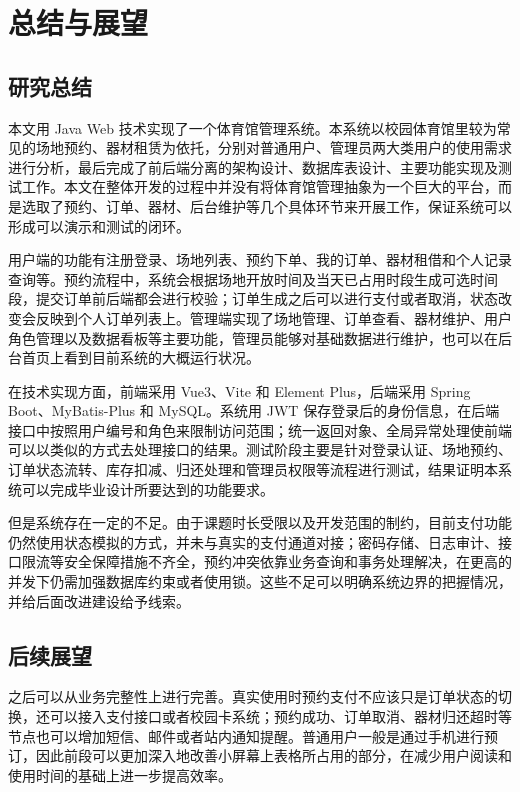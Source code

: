 
\chapter{总结与展望}

\section{研究总结}

本文用 Java Web 技术实现了一个体育馆管理系统。本系统以校园体育馆里较为常见的场地预约、器材租赁为依托，分别对普通用户、管理员两大类用户的使用需求进行分析，最后完成了前后端分离的架构设计、数据库表设计、主要功能实现及测试工作。本文在整体开发的过程中并没有将体育馆管理抽象为一个巨大的平台，而是选取了预约、订单、器材、后台维护等几个具体环节来开展工作，保证系统可以形成可以演示和测试的闭环。

用户端的功能有注册登录、场地列表、预约下单、我的订单、器材租借和个人记录查询等。预约流程中，系统会根据场地开放时间及当天已占用时段生成可选时间段，提交订单前后端都会进行校验；订单生成之后可以进行支付或者取消，状态改变会反映到个人订单列表上。管理端实现了场地管理、订单查看、器材维护、用户角色管理以及数据看板等主要功能，管理员能够对基础数据进行维护，也可以在后台首页上看到目前系统的大概运行状况。

在技术实现方面，前端采用 Vue3、Vite 和 Element Plus，后端采用 Spring Boot、MyBatis-Plus 和 MySQL。系统用 JWT 保存登录后的身份信息，在后端接口中按照用户编号和角色来限制访问范围；统一返回对象、全局异常处理使前端可以以类似的方式去处理接口的结果。测试阶段主要是针对登录认证、场地预约、订单状态流转、库存扣减、归还处理和管理员权限等流程进行测试，结果证明本系统可以完成毕业设计所要达到的功能要求。

但是系统存在一定的不足。由于课题时长受限以及开发范围的制约，目前支付功能仍然使用状态模拟的方式，并未与真实的支付通道对接；密码存储、日志审计、接口限流等安全保障措施不齐全，预约冲突依靠业务查询和事务处理解决，在更高的并发下仍需加强数据库约束或者使用锁。这些不足可以明确系统边界的把握情况，并给后面改进建设给予线索。

\section{后续展望}

之后可以从业务完整性上进行完善。真实使用时预约支付不应该只是订单状态的切换，还可以接入支付接口或者校园卡系统；预约成功、订单取消、器材归还超时等节点也可以增加短信、邮件或者站内通知提醒。普通用户一般是通过手机进行预订，因此前段可以更加深入地改善小屏幕上表格所占用的部分，在减少用户阅读和使用时间的基础上进一步提高效率。

